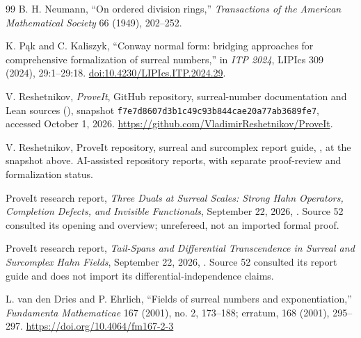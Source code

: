 \documentclass[11pt,letterpaper]{article}
\numberwithin{equation}{section}
\theoremstyle{definition}
\theoremstyle{remark}
\newcommand{\RepoCommit}{f7e7d8607d3b1c49c93b844cae20a77ab3689fe7}
\begin{document}
\begin{thebibliography}{99}
B. H. Neumann,
``On ordered division rings,''
\emph{Transactions of the American Mathematical Society} 66 (1949),
202--252.

K. P\k{a}k and C. Kaliszyk, ``Conway normal form: bridging approaches for
comprehensive formalization of surreal numbers,'' in \emph{ITP 2024},
LIPIcs 309 (2024), 29:1--29:18.
\href{https://doi.org/10.4230/LIPIcs.ITP.2024.29}{doi:10.4230/LIPIcs.ITP.2024.29}.

V. Reshetnikov,
\emph{ProveIt}, GitHub repository, surreal-number documentation and Lean
sources (), snapshot \texttt{\RepoCommit},
accessed October 1, 2026.
\url{https://github.com/VladimirReshetnikov/ProveIt}.

V. Reshetnikov, ProveIt repository, surreal and surcomplex report guide,
, at the snapshot above.
AI-assisted repository reports, with separate proof-review and
formalization status.

ProveIt research report, \emph{Three Duals at Surreal Scales: Strong Hahn
Operators, Completion Defects, and Invisible Functionals}, September 22, 2026,
.
Source 52 consulted its opening and overview; unrefereed, not an imported
formal proof.

ProveIt research report, \emph{Tail-Spans and Differential Transcendence in
Surreal and Surcomplex Hahn Fields}, September 22, 2026,
.
Source 52 consulted its report guide and does not import its
differential-independence claims.

L. van den Dries and P. Ehrlich,
``Fields of surreal numbers and exponentiation,''
\emph{Fundamenta Mathematicae} 167 (2001), no. 2, 173--188;
erratum, 168 (2001), 295--297.
\url{https://doi.org/10.4064/fm167-2-3}

\end{thebibliography}
\end{document}
